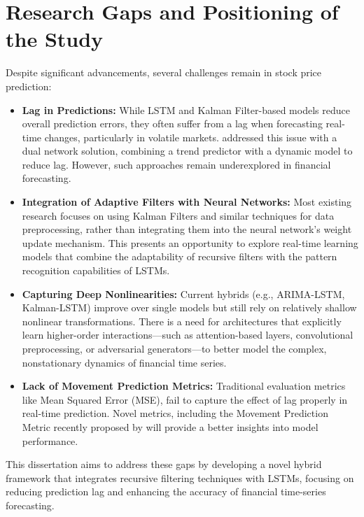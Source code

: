 \section{Research Gaps and Positioning of the Study}
Despite significant advancements, several challenges remain in stock price prediction:
\begin{itemize}
    \item \textbf{Lag in Predictions:} While LSTM and Kalman Filter-based models reduce overall prediction errors, they often suffer from a lag when forecasting real-time changes, particularly in volatile markets. \textcite{samanta_dual_2020} addressed this issue with a dual network solution, combining a trend predictor with a dynamic model to reduce lag. However, such approaches remain underexplored in financial forecasting.
    
    \item \textbf{Integration of Adaptive Filters with Neural Networks:} Most existing research focuses on using Kalman Filters and similar techniques for data preprocessing, rather than integrating them into the neural network's weight update mechanism. This presents an opportunity to explore real-time learning models that combine the adaptability of recursive filters with the pattern recognition capabilities of LSTMs.

    \item \textbf{Capturing Deep Nonlinearities:} Current hybrids (e.g., ARIMA-LSTM, Kalman-LSTM) improve over single models but still rely on relatively shallow nonlinear transformations. There is a need for architectures that explicitly learn higher-order interactions—such as attention-based layers, convolutional preprocessing, or adversarial generators—to better model the complex, nonstationary dynamics of financial time series.

    \item \textbf{Lack of Movement Prediction Metrics:} Traditional evaluation metrics
like Mean Squared Error (MSE), fail to capture the effect of lag properly in real-time prediction. Novel metrics, including the Movement Prediction Metric recently proposed by  \textcite{samanta_dual_2020} will provide a better
insights into model performance.
\end{itemize}

This dissertation aims to address these gaps by developing a novel hybrid framework that integrates recursive filtering techniques with LSTMs, focusing on reducing prediction lag and enhancing the accuracy of financial time-series forecasting.
